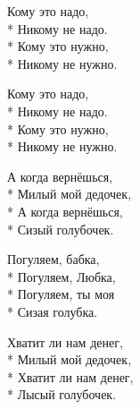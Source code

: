 \medskip

\begin{minipage}{\linewidth}
Кому это надо,\\*
Никому не надо.\\*
Кому это нужно,\\*
Никому не нужно.\\
\end{minipage}\par\medskip\nobreak

\medskip

\begin{minipage}{\linewidth}
\hspace*{1.5em}Кому это надо,\\*
\hspace*{1.5em}Никому не надо.\\*
\hspace*{1.5em}Кому это нужно,\\*
\hspace*{1.5em}Никому не нужно.\\
\end{minipage}\par\medskip\nobreak

\medskip

\begin{minipage}{\linewidth}
А когда вернёшься,\\*
Милый мой дедочек,\\*
А когда вернёшься,\\*
Сизый голубочек.\\
\end{minipage}\par\medskip\nobreak

\medskip

\begin{minipage}{\linewidth}
\hspace*{1.5em}Погуляем, бабка,\\*
\hspace*{1.5em}Погуляем, Любка,\\*
\hspace*{1.5em}Погуляем, ты моя\\*
\hspace*{1.5em}Сизая голубка.\\
\end{minipage}\par\medskip\nobreak

\medskip

\begin{minipage}{\linewidth}
Хватит ли нам денег,\\*
Милый мой дедочек,\\*
Хватит ли нам денег,\\*
Лысый голубочек.\\
\end{minipage}\par\medskip\nobreak

